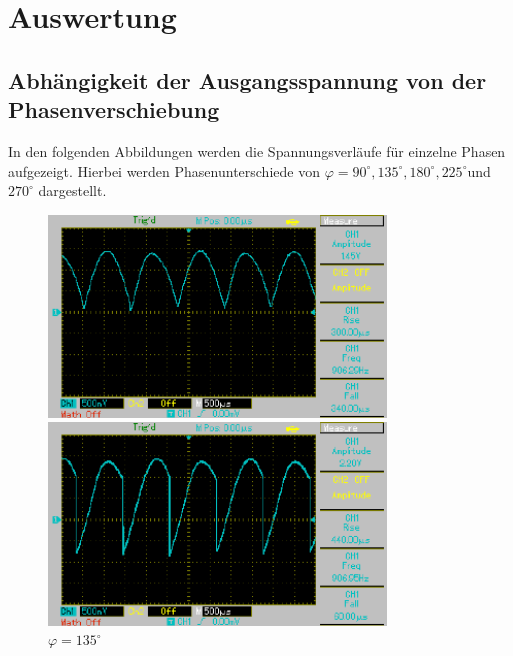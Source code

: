 \newpage
\section{Auswertung}
\subsection{Abhängigkeit der Ausgangsspannung von der Phasenverschiebung}
In den folgenden Abbildungen werden die Spannungsverläufe für einzelne Phasen aufgezeigt.
Hierbei werden Phasenunterschiede von $\varphi = 90^\circ, 135^\circ, 180^\circ, 225^\circ$und $270^\circ$ dargestellt. 

\begin{figure}[H]
    \begin{minipage}{0.4\textwidth}
     \centering
      \includegraphics[width=0.8\textwidth]{Auswertung/1.pdf}
      \caption{$\varphi = 90^\circ$}
	\label{fig:uno}
    \end{minipage}\hfill
    \begin{minipage}{0.4\textwidth}
     \centering
      \includegraphics[width=0.8\textwidth]{Auswertung/2.pdf}
      \caption{$\varphi = 135^\circ$}
	\label{fig:dos}
    \end{minipage}
\end{figure}

